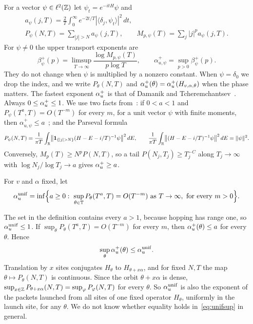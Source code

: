 For a vector $\psi\in\ell^2(\mathbb Z)$ let $\psi_t=e^{-itH}\psi$ and
\begin{equation}\label{eq:abel}
\begin{gathered}
a_\psi(j,T)=\frac2T\int_0^\infty e^{-2t/T}|\langle\delta_j,\psi_t\rangle|^2\,dt,\\
P_\psi(N,T)=\sum_{|j|>N}a_\psi(j,T),\qquad M_{p,\psi}(T)=\sum_j|j|^pa_\psi(j,T).
\end{gathered}
\end{equation}
For $\psi\ne0$ the upper transport exponents are
\begin{equation}\label{eq:exponents}
\beta^+_\psi(p)=\limsup_{T\to\infty}\frac{\log M_{p,\psi}(T)}{p\log T},\qquad\alpha^+_{u,\psi}=\sup_{p>0}\beta^+_\psi(p).
\end{equation}
They do not change when $\psi$ is multiplied by a nonzero constant. When $\psi=\delta_0$ we drop the index, and we write $P_\theta(N,T)$ and $\alpha_u^+(\theta)=\alpha_u^+(H_{v,\alpha,\theta})$ when the phase matters. The fastest exponent $\alpha_u^+$ is that of Damanik and Tcheremchantsev~\cite{DT2007}. Always $0\le\alpha_u^+\le1$. We use two facts from~\cite{DMuniv}: if $0<a<1$ and $P_\psi(T^a,T)=O(T^{-m})$ for every $m$, for a unit vector $\psi$ with finite moments, then $\alpha^+_{u,\psi}\le a$~\cite[Lemma~2.3]{DMuniv}; and the Parseval formula~\cite[Lemma~2.1]{DMuniv}
\begin{equation}\label{eq:parseval}
P_\psi(N,T)=\frac1{\pi T}\int_\R\bigl\|\un_{\{|j|>N\}}(H-E-i/T)^{-1}\psi\bigr\|^2\,dE,\qquad\frac1{\pi T}\int_\R\bigl\|(H-E-i/T)^{-1}\psi\bigr\|^2\,dE=\|\psi\|^2.
\end{equation}
Conversely, $M_{p}(T)\ge N^pP(N,T)$, so a tail $P(N_j,T_j)\ge T_j^{-C}$ along $T_j\to\infty$ with $\log N_j/\log T_j\to a$ gives $\alpha_u^+\ge a$.

\begin{definition}\label{def:unif}
For $v$ and $\alpha$ fixed, let
\[
\aunif=\inf\Bigl\{a\ge0:\ \sup_{\theta\in\T}P_\theta(T^a,T)=O(T^{-m})\text{ as }T\to\infty,\text{ for every }m>0\Bigr\}.
\]
\end{definition}

The set in the definition contains every $a>1$, because hopping has range one, so $\alpha_u^{\mathrm{unif}}\le1$. If $\sup_\theta P_\theta(T^a,T)=O(T^{-m})$ for every $m$, then $\alpha_u^+(\theta)\le a$ for every $\theta$. Hence
\begin{equation}\label{eq:unifsup}
\sup_\theta\alpha_u^+(\theta)\le\alpha_u^{\mathrm{unif}}.
\end{equation}
Translation by $x$ sites conjugates $H_\theta$ to $H_{\theta+x\alpha}$, and for fixed $N,T$ the map $\theta\mapsto P_\theta(N,T)$ is continuous. Since the orbit $\theta+x\alpha$ is dense, $\sup_{x\in\mathbb Z}P_{\theta+x\alpha}(N,T)=\sup_\varphi P_\varphi(N,T)$ for every $\theta$. So $\alpha_u^{\mathrm{unif}}$ is also the exponent of the packets launched from all sites of one fixed operator $H_\theta$, uniformly in the launch site, for any $\theta$. We do not know whether equality holds in~\eqref{eq:unifsup} in general.

